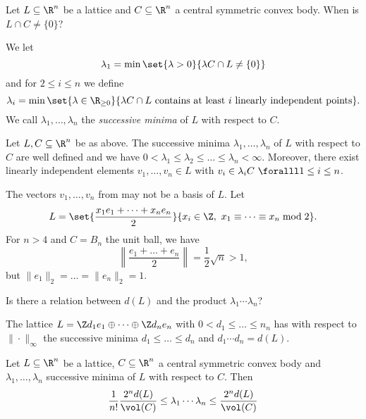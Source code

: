 Let \( L \subseteq \R^n \) be a lattice and \( C \subseteq \R^n \) a central symmetric convex body.
When is \( L \cap C \neq \{0\} \)?


\begin{defn*}
	We let
	\[ \lambda_1 = \min \set{\lambda > 0}{\lambda C \cap L \neq \{0\}} \]
	and for \( 2 \leq i \leq n \) we define
	\[ \lambda_i = \min \set{\lambda \in \R_{\geq 0}}{\lambda C \cap L \ \text{contains at least } i \ \text{linearly independent points}}. \]
	We call \( \lambda_1, \dotsc, \lambda_n \) the \emph{successive minima} of \( L \) with respect to \( C \).
\end{defn*}

\begin{lem}\label{thm:3.10}
	Let \( L, C \subseteq \R^n \) be as above.
	The successive minima \( \lambda_1, \dotsc, \lambda_n \) of \( L \) with respect to \( C \) are well defined and we have \( 0 < \lambda_1 \leq \lambda_2 \leq \dots \leq \lambda_n < \infty \).
	Moreover, there exist linearly independent elements \( v_1, \dotsc, v_n \in L \) with \( v_i \in \lambda_i C\ \foralll 1 \leq i \leq n \).
\end{lem}

\begin{cav*}
	The vectors \( v_1, \dotsc, v_n \) from  may not be a basis of \( L \).
	Let
	\[ L = \set{\frac{x_1 e_1 + \dots + x_n e_n}{2}}{x_i \in \Z,\ x_1 \equiv \dots \equiv x_n \bmod 2}. \]
	For \( n>4 \) and \( C = B_n \) the unit ball, we have
	\[ \left\| \frac{e_1 + \dots + e_n}{2} \right\| = \frac{1}{2} \sqrt{n} > 1, \]
	but \( \|e_1\|_2 = \dots = \|e_n\|_2 = 1 \).
\end{cav*}

\begin{frage*}
	Is there a relation between \( d(L) \) and the product \( \lambda_1 \dotsm \lambda_n \)?
\end{frage*}

\begin{exmp*}
	The lattice \( L = \Z d_1 e_1 \oplus \dots \oplus \Z d_n e_n \) with \( 0 < d_1 \leq \dots \leq n_n \) has with respect to \( \| \cdot \|_\infty \) the successive minima \( d_1 \leq \dots \leq d_n \) and \( d_1 \dotsm d_n = d(L) \).
\end{exmp*}

\begin{thmn}\label{thm:3.11} 
	Let \( L \subseteq \R^n \) be a lattice, \( C \subseteq \R^n \) a central symmetric convex body and \( \lambda_1, \dotsc, \lambda_n \) successive minima of \( L \) with respect to \( C \).
	Then
	\[ \frac{1}{n!} \frac{2^n d(L)}{\vol(C)} \leq \lambda_1 \dotsm \lambda_n \leq \frac{2^n d(L)}{\vol(C)} \]
\end{thmn}
